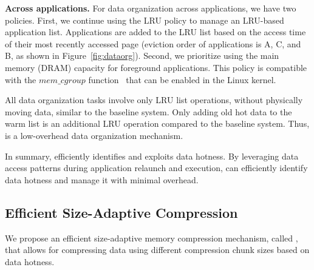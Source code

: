 \noindent\textbf{Across applications.} For data organization across applications, we have two policies. First, we continue using the LRU policy to manage an LRU-based application list. Applications are added to the LRU list based on the access time of their most recently accessed page (eviction order of applications is A, C, and B, as shown in Figure~\ref{fig:dataorg}). Second, we prioritize using the main memory (DRAM) capacity for foreground applications. This policy is compatible with the $mem\_cgroup$ function~\cite{memcgroup} that can be enabled in the Linux kernel.

All data organization tasks involve only LRU list operations, without physically moving data, similar to the baseline system. Only adding old hot data to the warm list is an additional LRU operation compared to the baseline system. Thus, \dataorg is a low-overhead data organization mechanism.

In summary, \dataorg efficiently identifies and exploits data hotness.
By leveraging data access patterns during application relaunch and execution, \dataorg can efficiently identify data hotness and manage it with minimal overhead.




\subsection{Efficient Size-Adaptive Compression}
\label{sec:compress}

We propose an efficient size-adaptive memory compression mechanism, called \compress, that allows for compressing data using different compression chunk sizes based on data hotness.


